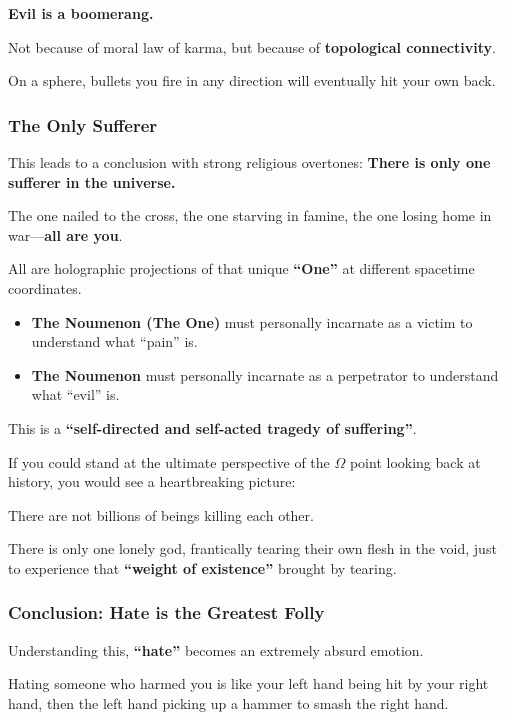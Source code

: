 \textbf{Evil is a boomerang.}

Not because of moral law of karma, but because of \textbf{topological connectivity}.

On a sphere, bullets you fire in any direction will eventually hit your own back.

\subsubsection{The Only Sufferer}

This leads to a conclusion with strong religious overtones: \textbf{There is only one sufferer in the universe.}

The one nailed to the cross, the one starving in famine, the one losing home in war---\textbf{all are you}.

All are holographic projections of that unique \textbf{``One''} at different spacetime coordinates.

\begin{itemize}
\item \textbf{The Noumenon (The One)} must personally incarnate as a victim to understand what ``pain'' is.

\item \textbf{The Noumenon} must personally incarnate as a perpetrator to understand what ``evil'' is.
\end{itemize}

This is a \textbf{``self-directed and self-acted tragedy of suffering''}.

If you could stand at the ultimate perspective of the $\Omega$ point looking back at history, you would see a heartbreaking picture:

There are not billions of beings killing each other.

There is only one lonely god, frantically tearing their own flesh in the void, just to experience that \textbf{``weight of existence''} brought by tearing.

\subsubsection{Conclusion: Hate is the Greatest Folly}

Understanding this, \textbf{``hate''} becomes an extremely absurd emotion.

Hating someone who harmed you is like your left hand being hit by your right hand, then the left hand picking up a hammer to smash the right hand.

